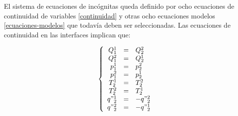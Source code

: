 El sistema de ecuaciones de incógnitas queda definido por ocho ecuaciones de continuidad de variables \ref{continuidad}
y otras ocho ecuaciones modelos \ref{ecuaciones-modelos} que todavía deben ser seleccionadas.
Las ecuaciones de continuidad en las interfaces implican que:

\begin{equation}
\left\{ \begin{array}{rcl}
Q_1^1&=& Q_2^2 \\
Q_1^2&=& Q_2^1 \\
p_1^1&=& p_2^2 \\
p_1^2&=& p_2^1 \\
T_2^1&=& T_2^2 \\
T_2^2&=& T_2^1 \\
q"_2^1&=& - q"_2^2 \\
q"_2^2&=& - q"_2^1
\end{array}
\right.
\end{equation}

